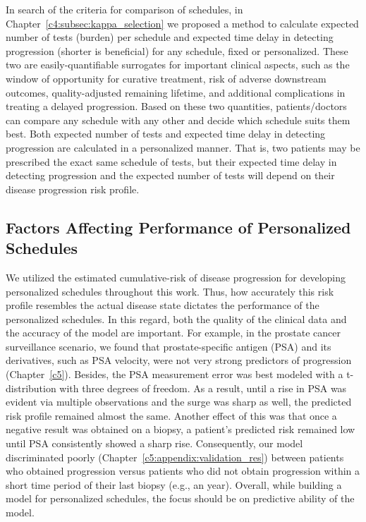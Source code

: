 In search of the criteria for comparison of schedules, in Chapter~\ref{c4:subsec:kappa_selection} we proposed a method to calculate expected number of tests (burden) per schedule and expected time delay in detecting progression (shorter is beneficial) for any schedule, fixed or personalized. These two are easily-quantifiable surrogates for important clinical aspects, such as the window of opportunity for curative treatment, risk of adverse downstream outcomes, quality-adjusted remaining lifetime, and additional complications in treating a delayed progression. Based on these two quantities, patients/doctors can compare any schedule with any other and decide which schedule suits them best. Both expected number of tests and expected time delay in detecting progression are calculated in a personalized manner. That is, two patients may be prescribed the exact same schedule of tests, but their expected time delay in detecting progression and the expected number of tests will depend on their disease progression risk profile.

\subsection{Factors Affecting Performance of Personalized Schedules}
We utilized the estimated cumulative-risk of disease progression for developing personalized schedules throughout this work. Thus, how accurately this risk profile resembles the actual disease state dictates the performance of the personalized schedules. In this regard, both the quality of the clinical data and the accuracy of the model are important. For example, in the prostate cancer surveillance scenario, we found that prostate-specific antigen (PSA) and its derivatives, such as PSA velocity, were not very strong predictors of progression (Chapter~\ref{c5}). Besides, the PSA measurement error was best modeled with a t-distribution with three degrees of freedom. As a result, until a rise in PSA was evident via multiple observations and the surge was sharp as well, the predicted risk profile remained almost the same. Another effect of this was that once a negative result was obtained on a biopsy, a patient's predicted risk remained low until PSA consistently showed a sharp rise. Consequently, our model discriminated poorly (Chapter~\ref{c5:appendix:validation_res}) between patients who obtained progression versus patients who did not obtain progression within a short time period of their last biopsy (e.g., an year). Overall, while building a model for personalized schedules, the focus should be on predictive ability of the model.

